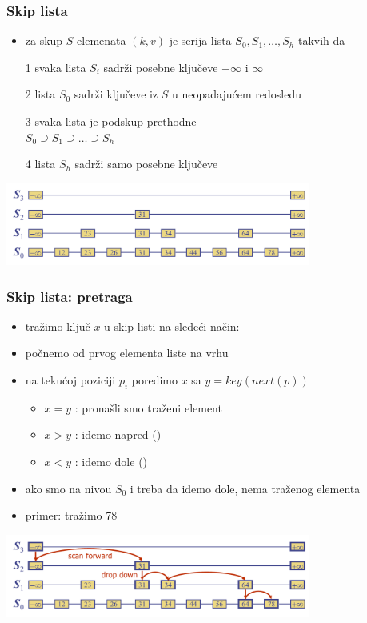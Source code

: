\documentclass[compress]{beamer}
\begin{document}
\begin{frame}[fragile]
  \frametitle{Skip lista}
  \begin{itemize}
    \item {} za skup $S$ elemenata $(k, v)$ je serija lista $S_0, S_1, \ldots, S_h$ takvih da
    \item[1] svaka lista $S_i$ sadrži posebne ključeve $-\infty$ i $\infty$
    \item[2] lista $S_0$ sadrži ključeve iz $S$ u neopadajućem redosledu
    \item[3] svaka lista je podskup prethodne \\
    $S_0 \supseteq S_1 \supseteq \ldots \supseteq S_h$
    \item[4] lista $S_h$ sadrži samo posebne ključeve 
  \end{itemize}
  \begin{center}
    \includegraphics[width=10cm]{asp-10-pic11.png}
  \end{center}
\end{frame}

\begin{frame}[fragile]
  \frametitle{Skip lista: pretraga}
  \begin{itemize}
    \item tražimo ključ $x$ u skip listi na sledeći način:
    \item počnemo od prvog elementa liste na vrhu
    \item na tekućoj poziciji $p_i$ poredimo $x$ sa $y = key(next(p))$
    \begin{itemize}
      \item $x = y$ : pronašli smo traženi element
      \item $x > y$ : idemo napred ()
      \item $x < y$ : idemo dole ()
    \end{itemize}
    \item ako smo na nivou $S_0$ i treba da idemo dole, nema traženog elementa
    \item primer: tražimo 78
  \end{itemize}
  \begin{center}
    \includegraphics[width=10cm]{asp-10-pic12.png}
  \end{center}
\end{frame}
\end{document}
